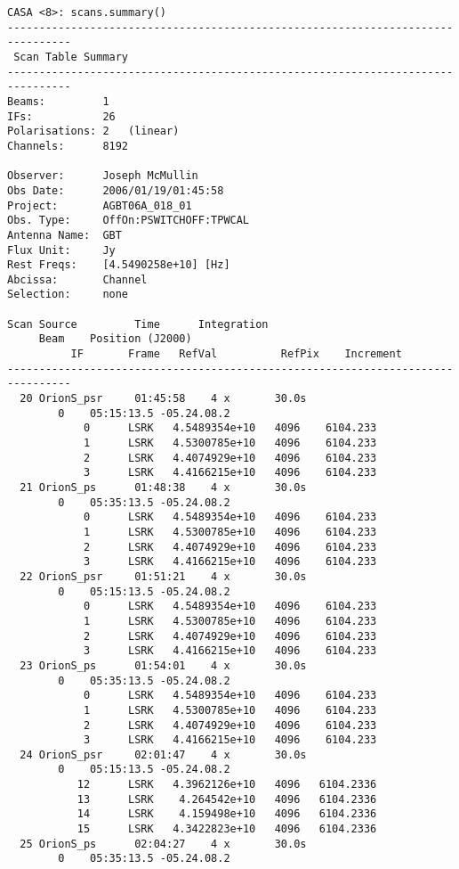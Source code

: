 \small
\begin{verbatim}
CASA <8>: scans.summary()
--------------------------------------------------------------------------------
 Scan Table Summary
--------------------------------------------------------------------------------
Beams:         1   
IFs:           26  
Polarisations: 2   (linear)
Channels:      8192

Observer:      Joseph McMullin
Obs Date:      2006/01/19/01:45:58
Project:       AGBT06A_018_01
Obs. Type:     OffOn:PSWITCHOFF:TPWCAL
Antenna Name:  GBT
Flux Unit:     Jy
Rest Freqs:    [4.5490258e+10] [Hz]
Abcissa:       Channel
Selection:     none

Scan Source         Time      Integration       
     Beam    Position (J2000)
          IF       Frame   RefVal          RefPix    Increment   
--------------------------------------------------------------------------------
  20 OrionS_psr     01:45:58    4 x       30.0s
        0    05:15:13.5 -05.24.08.2
            0      LSRK   4.5489354e+10   4096    6104.233
            1      LSRK   4.5300785e+10   4096    6104.233
            2      LSRK   4.4074929e+10   4096    6104.233
            3      LSRK   4.4166215e+10   4096    6104.233
  21 OrionS_ps      01:48:38    4 x       30.0s
        0    05:35:13.5 -05.24.08.2
            0      LSRK   4.5489354e+10   4096    6104.233
            1      LSRK   4.5300785e+10   4096    6104.233
            2      LSRK   4.4074929e+10   4096    6104.233
            3      LSRK   4.4166215e+10   4096    6104.233
  22 OrionS_psr     01:51:21    4 x       30.0s
        0    05:15:13.5 -05.24.08.2
            0      LSRK   4.5489354e+10   4096    6104.233
            1      LSRK   4.5300785e+10   4096    6104.233
            2      LSRK   4.4074929e+10   4096    6104.233
            3      LSRK   4.4166215e+10   4096    6104.233
  23 OrionS_ps      01:54:01    4 x       30.0s
        0    05:35:13.5 -05.24.08.2
            0      LSRK   4.5489354e+10   4096    6104.233
            1      LSRK   4.5300785e+10   4096    6104.233
            2      LSRK   4.4074929e+10   4096    6104.233
            3      LSRK   4.4166215e+10   4096    6104.233
  24 OrionS_psr     02:01:47    4 x       30.0s
        0    05:15:13.5 -05.24.08.2
           12      LSRK   4.3962126e+10   4096   6104.2336
           13      LSRK    4.264542e+10   4096   6104.2336
           14      LSRK    4.159498e+10   4096   6104.2336
           15      LSRK   4.3422823e+10   4096   6104.2336
  25 OrionS_ps      02:04:27    4 x       30.0s
        0    05:35:13.5 -05.24.08.2

\end{verbatim}
